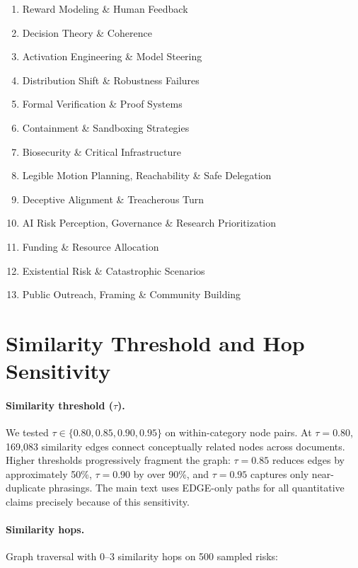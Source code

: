 \documentclass[10pt,twocolumn,letterpaper]{article}
\begin{document}
\begin{small}
\begin{enumerate}
\item[27.] Reward Modeling \& Human Feedback
\item[28.] Decision Theory \& Coherence
\item[29.] Activation Engineering \& Model Steering
\item[30.] Distribution Shift \& Robustness Failures
\item[31.] Formal Verification \& Proof Systems
\item[32.] Containment \& Sandboxing Strategies
\item[33.] Biosecurity \& Critical Infrastructure
\item[34.] Legible Motion Planning, Reachability \& Safe Delegation
\item[35.] Deceptive Alignment \& Treacherous Turn
\item[36.] AI Risk Perception, Governance \& Research Prioritization
\item[37.] Funding \& Resource Allocation
\item[38.] Existential Risk \& Catastrophic Scenarios
\item[39.] Public Outreach, Framing \& Community Building
\end{enumerate}
\end{small}

\section{Similarity Threshold and Hop Sensitivity}
\label{app:sensitivity}

\paragraph{Similarity threshold ($\tau$).} We tested $\tau \in \{0.80, 0.85, 0.90,
0.95\}$ on within-category node pairs. At $\tau{=}0.80$, 169{,}083 similarity edges
connect conceptually related nodes across documents. Higher thresholds progressively
fragment the graph: $\tau{=}0.85$ reduces edges by approximately 50\%, $\tau{=}0.90$ by
over 90\%, and $\tau{=}0.95$ captures only near-duplicate phrasings. The main text uses
EDGE-only paths for all quantitative claims precisely because of this sensitivity.

\paragraph{Similarity hops.} Graph traversal with 0--3 similarity hops on 500 sampled
risks:
\end{document}
